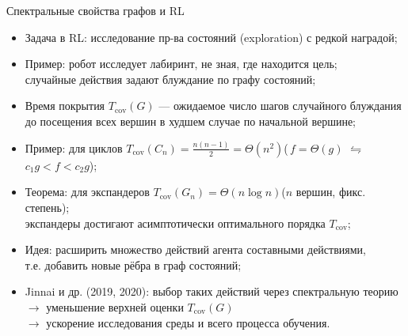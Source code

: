 \documentclass[serif, aspectratio=169]{beamer}
\begin{document}
\begin{frame}{Спектральные свойства графов и RL}
    \begin{itemize}
        \item Задача в RL: исследование пр-ва состояний (exploration) с редкой наградой;
        \item Пример: робот исследует лабиринт, не зная, где находится цель;\\ случайные действия задают блуждание по графу состояний;
        \item Время покрытия $T_{\mathrm{cov}}(G)$ --- ожидаемое число шагов случайного блуждания до посещения всех вершин в худшем случае по начальной вершине;
        \item Пример: для циклов $T_{\mathrm{cov}}(C_n)=\frac{n(n-1)}{2}=\Theta(n^2)$\quad (\,$f=\Theta(g)$ $\leftrightharpoons$ $c_1 g < f < c_2 g$);
        \item Теорема: для экспандеров $T_{\mathrm{cov}}(G_n)=\Theta(n\log n)$\quad ($n$ вершин, фикс. степень);\\
        экспандеры достигают асимптотически оптимального порядка $T_{\mathrm{cov}}$;
        \item Идея: расширить множество действий агента составными действиями,\\ т.е. добавить новые рёбра в граф состояний;
        \item Jinnai и др. (2019, 2020): выбор таких действий через спектральную теорию\\
        $\to$ уменьшение верхней оценки $T_{\mathrm{cov}}(G)$\\
        $\to$ ускорение исследования среды и всего процесса обучения.
    \end{itemize}
    
\end{frame}
\end{document}
